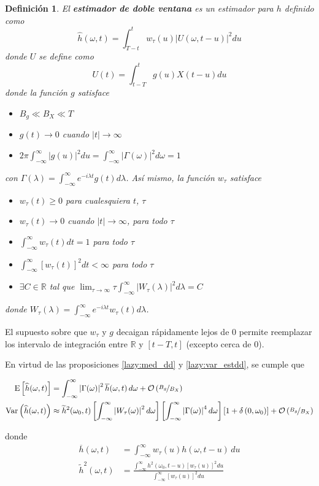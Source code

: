 \documentclass[12pt,letterpaper]{book}
\newtheorem{definicion}{Definición}[chapter]
\newcommand{\R}{\mathbb{R}}
\newcommand{\intR}{\int_{-\infty}^{\infty}}
\newcommand{\E}[1]{\mathrm{E}\left[ #1 \right]}
\newcommand{\Var}[1]{\mathrm{Var}\left( #1 \right)}
\newcommand{\abso}[1]{\left| #1 \right|}
\newcommand{\orden}[1]{\mathcal{O}\left( #1 \right)}
\begin{document}
\begin{definicion}
\label{estimador_doble_ventana}
El \textbf{estimador de doble ventana} es un estimador para $h$ definido como
\begin{equation}
\widehat{h}(\omega, t) = \int_{T-t}^{t} w_\tau (u) \abso{U(\omega,t-u)}^{2} du
\end{equation}
donde $U$ se define como
\begin{equation}
U(t) = \int_{t-T}^{t} g(u) X(t-u) du
\end{equation}
donde la función $g$ satisface
\begin{itemize}
\item $B_g \ll B_X \ll T$
\item $g(t) \rightarrow 0$ cuando $\abso{t} \rightarrow \infty$
\item $2\pi \intR \abso{g(u)}^{2} du = \intR \abso{\Gamma(\omega)}^{2} d\omega = 1$
\end{itemize}
con $\Gamma(\lambda) = \intR e^{-i \lambda t} g(t) d\lambda$. Así mismo, la función $w_\tau$ satisface
\begin{itemize}
\item $w_\tau(t) \geq 0$ para cualesquiera $t$, $\tau$
\item $w_\tau(t) \rightarrow 0$ cuando $\abso{t} \rightarrow \infty$, para todo $\tau$
\item $\displaystyle \intR w_\tau(t) dt = 1$ para todo $\tau$
\item $\displaystyle \intR \left[ w_\tau(t) \right]^{2} dt < \infty$ para todo $\tau$
\item $\exists C \in \R$ tal que  
$\displaystyle \lim_{\tau\rightarrow\infty} \tau \intR \abso{ W_{\tau}(\lambda) }^{2} d\lambda = C$
\end{itemize}
donde $W_\tau(\lambda) = \intR e^{-i \lambda t} w_\tau(t) d\lambda$.
\end{definicion}

El supuesto sobre que $w_\tau$ y $g$ decaigan rápidamente lejos de 0 permite reemplazar los intervalo de integración entre $\R$ y $[t-T,t]$ (excepto cerca de 0). 

En virtud de las proposiciones \ref{lazy:med_dd} y \ref{lazy:var_estdd}, se cumple que
\begin{small}
\begin{align}
\E{\widehat{h}(\omega, t)} &= \intR \abso{\Gamma(\omega)}^{2} \overline{h}(\omega,t)\, d\omega +
\orden{\nicefrac{B_g}{B_X}} \\
\Var{\widehat{h}(\omega, t)} &\approx \widetilde{h}^{2}(\omega_0,t) \left[ \intR \abso{W_\tau(\omega)}^{2} d\omega \right] \left[ \intR \abso{\Gamma(\omega)}^{4} d\omega \right] \left[1+\delta\left(0,\omega_0\right)\right] + \orden{\nicefrac{B_g}{B_X}}
\end{align}
\end{small}
donde
\begin{align}
\overline{h}(\omega,t) &= \intR w_\tau (u) h(\omega, t-u)\, du \\
\widetilde{h}^{2}(\omega,t) &= \frac{\intR h^{2}(\omega_0,t-u) \left[w_\tau(u)\right]^{2} du}{\intR \left[w_\tau(u)\right]^2 du}
\end{align}
\end{document}
